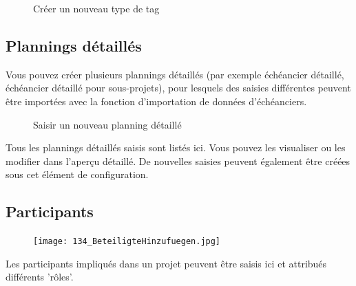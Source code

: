 \begin{figure}[H]
\caption{Créer un nouveau type de tag}
\end{figure}\pagebreak

\subsection{Plannings détaillés}

Vous pouvez créer plusieurs plannings détaillés (par exemple échéancier détaillé, échéancier détaillé pour sous-projets), pour lesquels des saisies différentes peuvent être importées avec la fonction d'importation de données d'échéanciers.

\begin{figure}[H]
\caption{Saisir un nouveau planning détaillé}
\end{figure}

Tous les plannings détaillés saisis sont listés ici. Vous pouvez les visualiser ou les modifier dans l'aperçu détaillé. De nouvelles saisies peuvent également être créées sous cet élément de configuration.

\subsection{Participants}

\begin{figure}
\vspace{-25pt}
\texttt{[image: 134\_BeteiligteHinzufuegen.jpg]}
\end{figure}

Les participants impliqués dans un projet peuvent être saisis ici et attribués différents 'rôles'.


